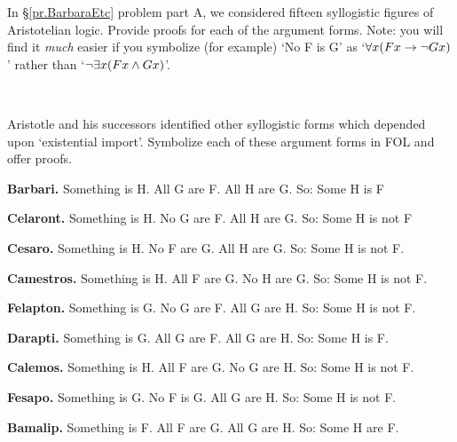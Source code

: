 \problempart
\label{pr.BarbaraEtc.proof1}
In \S\ref{pr.BarbaraEtc} problem part A, we considered fifteen syllogistic figures of Aristotelian logic. Provide proofs for each of the argument forms. Note: you will find it \emph{much} easier if you symbolize (for example) `No F is G' as `$\forall x (Fx \rightarrow \neg Gx)$' rather than `$\neg \exists x(Fx \wedge Gx)$'.

\

\problempart
\label{pr.BarbaraEtc.proof2}
Aristotle and his successors identified other syllogistic forms which depended upon `existential import'. Symbolize each of these argument forms in FOL and offer proofs.
\begin{ebullet}
	\item \textbf{Barbari.} Something is H. All G are F. All H are G. So: Some H is F
	\item \textbf{Celaront.} Something is H. No G are F. All H are G. So: Some H is not F
	\item \textbf{Cesaro.} Something is H. No F are G. All H are G. So: Some H is not F.
	\item \textbf{Camestros.} Something is H. All F are G. No H are G. So: Some H is not F.
	\item \textbf{Felapton.} Something is G. No G are F. All G are H. So: Some H is not F.
	\item \textbf{Darapti.} Something is G. All G are F. All G are H. So: Some H is F.
	\item \textbf{Calemos.} Something is H. All F are G. No G are H. So: Some H is not F.
	\item \textbf{Fesapo.} Something is G. No F is G. All G are H. So: Some H is not F.
	\item \textbf{Bamalip.} Something is F. All F are G. All G are H. So: Some H are F.
\end{ebullet}




